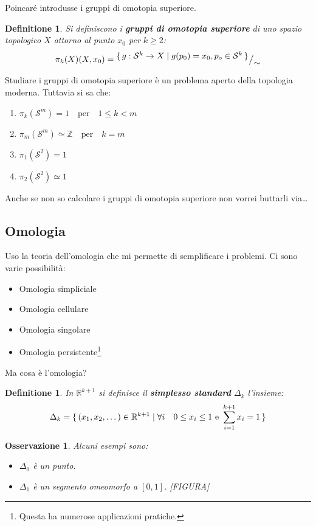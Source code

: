 \documentclass{article}
\newtheorem{osservation}[theorem]{Osservazione}
\newtheorem{definition}[theorem]{Definitione}
\newcommand{\Z}{\mathbb{Z}}
\newcommand{\RN}[1][]{\mathbb{R}^#1}
\newcommand{\Sph}[1][]{\mathcal{S}^#1}
\newcommand*\quot[2]{{^{\textstyle #1}\big/_{\textstyle #2}}}
\begin{document}
Poincaré introdusse i gruppi di omotopia superiore.

\begin{definition}
  Si definiscono i \textbf{gruppi di omotopia superiore} di uno spazio topologico $ X $
  attorno al punto $ x_0 $ per $ k \geq 2 $:
  \[
    \pi_k(X) (X, x_0) = \quot{\set{ g: \Sph{k} \to X | g(p_0) = x_0, p_o \in \Sph{k}}}{\sim}
  \]
\end{definition}
Studiare i gruppi di omotopia superiore è un problema aperto della topologia moderna.
Tuttavia si sa che:
\begin{enumerate}
\item $ \pi_k(\Sph{m}) = 1 \quad \text{per} \quad 1 \leq k < m $
\item $ \pi_m(\Sph{m}) \simeq \Z \quad \text{per} \quad k = m $
\item $ \pi_1(\Sph{2}) = 1 $
\item $ \pi_2(\Sph{2}) \simeq 1 $
\end{enumerate}

Anche se non so calcolare i gruppi di omotopia superiore non vorrei buttarli via\dots

\subsection{Omologia}

Uso la teoria dell'omologia che mi permette di semplificare i problemi.
Ci sono varie possibilità:
\begin{itemize}
  \item Omologia simpliciale
  \item Omologia cellulare
  \item Omologia singolare
  \item Omologia persistente\footnote{Questa ha numerose applicazioni pratiche.}
\end{itemize}
Ma cosa è l'omologia?

\begin{definition}
  In $ \RN{k+1} $ si definisce il \textbf{simplesso standard} $ \Delta_k $ l'insieme:
  \[
    \Delta_k = \set{(x_1,x_2,\dots) \in \RN{k+1} | \forall i \quad 0 \leq x_i \leq 1 \text{ e } \sum_{i=1}^{k+1}x_i = 1}
  \]
\end{definition}

\begin{osservation} Alcuni esempi sono:
  \begin{itemize}
  \item $ \Delta_0 $ è un punto.
  \item $ \Delta_1 $ è un segmento omeomorfo a $ [0,1] $.
    [FIGURA]
  \end{itemize}
\end{osservation}
\end{document}
